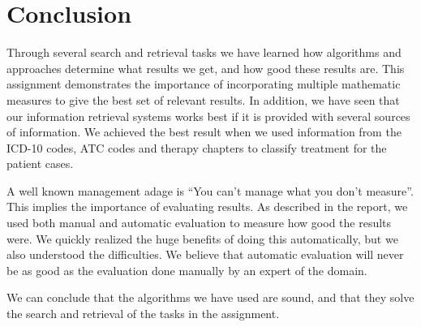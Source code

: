 \chapter{Conclusion}
\label{cha:conclusion}
Through several search and retrieval tasks we have learned how algorithms and approaches determine what results we get, and how good these results are. This assignment demonstrates the importance of incorporating multiple mathematic measures to give the best set of relevant results. In addition, we have seen that our information retrieval systems works best if it is provided with several sources of information. We achieved the best result when we used information from the ICD-10 codes, ATC codes and therapy chapters to classify treatment for the patient cases.

A well known management adage is ``You can't manage what you don't measure''. This implies the importance of evaluating results. As described in the report, we used both manual and automatic evaluation to measure how good the results were. We quickly realized the huge benefits of doing this automatically, but we also understood the difficulties. We believe that automatic evaluation will never be as good as the evaluation done manually by an expert of the domain. 

We can conclude that the algorithms we have used are sound, and that they solve the search and retrieval of the tasks in the assignment. 